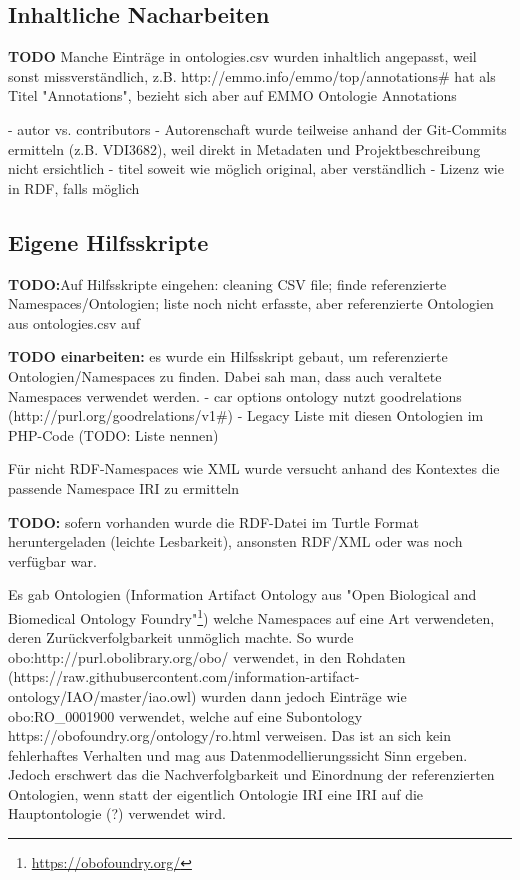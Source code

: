 \documentclass{article}
\begin{document}
\subsection{Inhaltliche Nacharbeiten}

\textbf{TODO} Manche Einträge in ontologies.csv wurden inhaltlich angepasst, weil sonst missverständlich, z.B. http://emmo.info/emmo/top/annotations\# hat als Titel "Annotations", bezieht sich aber auf EMMO Ontologie Annotations

- autor vs. contributors
  - Autorenschaft wurde teilweise anhand der Git-Commits ermitteln (z.B. VDI3682), weil direkt in Metadaten und Projektbeschreibung nicht ersichtlich
- titel soweit wie möglich original, aber verständlich
- Lizenz wie in RDF, falls möglich


\subsection{Eigene Hilfsskripte}

\textbf{TODO:}Auf Hilfsskripte eingehen: cleaning CSV file; finde referenzierte Namespaces/Ontologien; liste noch nicht erfasste, aber referenzierte Ontologien aus ontologies.csv auf

\textbf{TODO einarbeiten:} es wurde ein Hilfsskript gebaut, um referenzierte Ontologien/Namespaces zu finden. Dabei sah man, dass auch veraltete Namespaces verwendet werden.
- car options ontology nutzt goodrelations (http://purl.org/goodrelations/v1\#) - Legacy Liste mit diesen Ontologien im PHP-Code (TODO: Liste nennen)

Für nicht RDF-Namespaces wie XML wurde versucht anhand des Kontextes die passende Namespace IRI zu ermitteln











\textbf{TODO:} sofern vorhanden wurde die RDF-Datei im Turtle Format heruntergeladen (leichte Lesbarkeit), ansonsten RDF/XML oder was noch verfügbar war.



Es gab Ontologien (Information Artifact Ontology aus "Open Biological and Biomedical Ontology Foundry"\footnote{\url{https://obofoundry.org/}}) welche Namespaces auf eine Art verwendeten, deren Zurückverfolgbarkeit unmöglich machte.
So wurde obo:http://purl.obolibrary.org/obo/ verwendet, in den Rohdaten (https://raw.githubusercontent.com/information-artifact-ontology/IAO/master/iao.owl) wurden dann jedoch Einträge wie obo:RO\_0001900 verwendet, welche auf eine Subontology https://obofoundry.org/ontology/ro.html verweisen.
Das ist an sich kein fehlerhaftes Verhalten und mag aus Datenmodellierungssicht Sinn ergeben.
Jedoch erschwert das die Nachverfolgbarkeit und Einordnung der referenzierten Ontologien, wenn statt der eigentlich Ontologie IRI eine IRI auf die Hauptontologie (?) verwendet wird.
\end{document}
